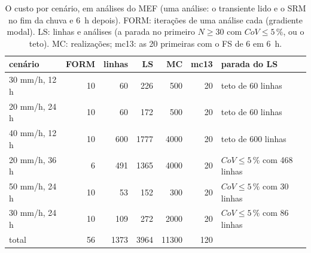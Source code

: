 \begin{table}[htbp]\centering\footnotesize
\caption{O custo por cenário, em análises do MEF (uma análise: o transiente lido e o SRM no fim da chuva e 6~h depois). FORM: iterações de uma análise cada (gradiente modal). LS: linhas e análises (a parada no primeiro $N \ge 30$ com $CoV \le 5\,\%$, ou o teto). MC: realizações; mc13: as 20 primeiras com o FS de 6 em 6~h.}\label{tab:custo}
\begin{tabular}{lrrrrrl}\toprule
cenário & FORM & linhas & LS & MC & mc13 & parada do LS \\\midrule
30 mm/h, 12 h & 10 & 60 & 226 & 500 & 20 & teto de 60 linhas \\
20 mm/h, 24 h & 10 & 60 & 172 & 500 & 20 & teto de 60 linhas \\
40 mm/h, 12 h & 10 & 600 & 1777 & 4000 & 20 & teto de 600 linhas \\
20 mm/h, 36 h & 6 & 491 & 1365 & 4000 & 20 & $CoV \le 5\,\%$ com 468 linhas \\
50 mm/h, 24 h & 10 & 53 & 152 & 300 & 20 & $CoV \le 5\,\%$ com 30 linhas \\
30 mm/h, 24 h & 10 & 109 & 272 & 2000 & 20 & $CoV \le 5\,\%$ com 86 linhas \\
\midrule total & 56 & 1373 & 3964 & 11300 & 120 & \\
\bottomrule\end{tabular}\end{table}
